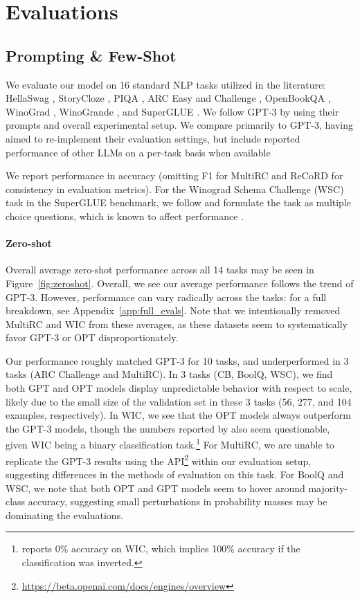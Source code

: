 \section{Evaluations}
\label{sec:main_results}

\subsection{Prompting \& Few-Shot}
\label{sec:prompt_and_fewshot}

We evaluate our model on 16 standard NLP tasks utilized in the literature: HellaSwag \cite{hellaswag}, StoryCloze \cite{storycloze}, PIQA \cite{bisk2020piqa}, ARC Easy and Challenge \cite{arc_challenge}, OpenBookQA \cite{openbookqa}, WinoGrad \cite{levesque2011winograd}, WinoGrande \cite{winogrande}, and SuperGLUE \cite{wang2019superglue}. We follow GPT-3 \cite{brown2020gpt3} by using their prompts and overall experimental setup. We compare primarily to GPT-3, having aimed to re-implement their  evaluation settings, but include reported performance of other LLMs on a per-task basis when available \cite{J1WhitePaper,gopher2022,chinchilla2022,eleutherai2022}

We report performance in accuracy (omitting F1 for MultiRC and ReCoRD for consistency in evaluation metrics). For the Winograd Schema Challenge (WSC) task in the SuperGLUE benchmark, we follow \cite{brown2020gpt3} and formulate the task as multiple choice questions, which is known to affect performance \cite{liu2020precise}.

\paragraph{Zero-shot} Overall average zero-shot performance across all 14 tasks may be seen in Figure~\ref{fig:zeroshot}. Overall, we see our average performance follows the trend of GPT-3. However, performance can vary radically across the tasks: for a full breakdown, see Appendix~\ref{app:full_evals}.  Note that we intentionally removed MultiRC and WIC from these averages, as these datasets seem to systematically favor GPT-3 or OPT disproportionately.

Our performance roughly matched GPT-3 for 10 tasks, and underperformed in 3 tasks (ARC Challenge and MultiRC). In 3 tasks (CB, BoolQ, WSC), we find both GPT and OPT models display unpredictable behavior with respect to scale, likely due to the small size of the validation set in these 3 tasks (56, 277, and 104 examples, respectively). In WIC, we see that the OPT models always outperform the GPT-3 models, though the numbers reported by \citet{brown2020gpt3} also seem questionable, given WIC being a binary classification task.\footnote{\citet{brown2020gpt3} reports 0\% accuracy on WIC, which implies 100\% accuracy if the classification was inverted.} For MultiRC, we are unable to replicate the GPT-3 results using the \davinci{} API\footnote{\url{https://beta.openai.com/docs/engines/overview}} within our evaluation setup, suggesting differences in the methods of evaluation on this task. For BoolQ and WSC, we note that both OPT and GPT models seem to hover around majority-class accuracy, suggesting small perturbations in probability masses may be dominating the evaluations.

